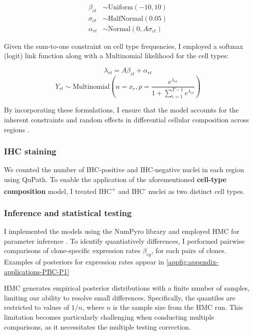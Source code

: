 \begin{align}
\beta_{ct} &\sim \text{Uniform}(-10, 10) \\
\sigma_{ct} &\sim \text{HalfNormal}(0.05) \\
\alpha_{rt} &\sim \text{Normal}(0, A\sigma_{ct})
\end{align}

Given the sum-to-one constraint on cell type frequencies, I employed a softmax (logit) link function along with a Multinomial likelihood for the cell types:

\begin{equation}
\lambda_{rt} = A\beta_{ct} + \alpha_{rt}
\end{equation}
\begin{equation}
Y_{rt} \sim \text{Multinomial}\left(n=x_r, p=\frac{e^{\lambda_{rt}}}{1 + \sum_{i=1}^{T-1} e^{\lambda_{rt}}}\right)
\end{equation}

By incorporating these formulations, I ensure that the model accounts for the inherent constraints and random effects in differential cellular composition across regions .

\subsubsection*{IHC staining}
We counted the number of IHC-positive and IHC-negative nuclei in each region using QuPath. To enable the application of the aforementioned \textbf{cell-type composition} model, I treated IHC\textsuperscript{+} and IHC\textsuperscript{-} nuclei as two distinct cell types.

\subsubsection*{Inference and statistical testing}

I implemented the models using the \ac{NumPyro} library and employed \acf{HMC} for parameter inference . To identify quantiatively differences, I performed pairwise comparisons of clone-specific expression rates $\beta_{cg}$, for each pairs of clones. Examples of posteriors for expression rates appear in \cref{appfig:appendix-applications-PBC-P1}

\ac{HMC} generates empirical posterior distributions with a finite number of samples, limiting our ability to resolve small differences. Specifically, the quantiles are restricted to values of $1/n$, where $n$ is the sample size from the \ac{HMC} run. This limitation becomes particularly challenging when conducting multiple comparisons, as it necessitates the multiple testing correction. 

